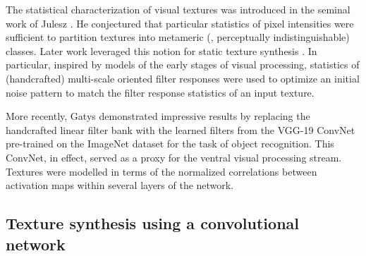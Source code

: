 The statistical characterization of visual textures was introduced
in the seminal work of Julesz \cite{julesz1962}.
He conjectured that particular statistics of pixel intensities
were sufficient to partition textures into metameric (\ie,
perceptually indistinguishable) classes. 
Later work leveraged this notion for static texture synthesis
\cite{heeger1995pyramid,portilla2000parametric}.
In particular, inspired by models of the early stages of visual 
processing, statistics of (handcrafted) multi-scale oriented filter 
responses were used to optimize an initial noise pattern 
to match the filter response statistics of an input texture.

More recently, Gatys \etal \cite{gatys2015} demonstrated
impressive results by replacing the handcrafted linear filter bank with the learned filters from the VGG-19
\cite{simonyan2014very} ConvNet pre-trained on the ImageNet \cite{russakovsky2015} dataset for the task of object
recognition. This ConvNet, in effect, served as a proxy for the ventral visual
processing stream. 
Textures were modelled in terms of the normalized correlations between activation maps within several layers of the network.

\subsection{Texture synthesis using a convolutional network}
\label{sec:texture_synthesis_using_a_convnet}

